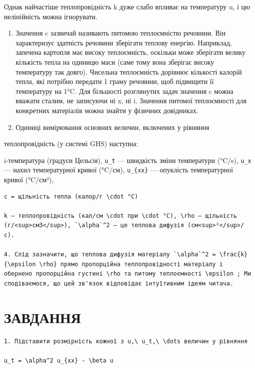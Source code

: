 \documentclass[
  ukrainian,
]{article}
\begin{document}
Однак найчастіше теплопровідність k дуже слабо впливає на температуру u,
і цю нелінійність можна ігнорувати.

\begin{enumerate}
\def\labelenumi{\arabic{enumi}.}
\setcounter{enumi}{1}
\item
  Значення c зазвичай називають питомою теплоємністю речовини. Він
  характеризує здатність речовини зберігати теплову енергію. Наприклад,
  запечена картопля має високу теплоємність, оскільки може зберігати
  велику кількість тепла на одиницю маси (саме тому вона зберігає високу
  температуру так довго). Чисельна теплоємність дорівнює кількості
  калорій тепла, які потрібно передати 1 граму речовини, щоб підвищити
  її температуру на 1°C. Для більшості розглянутих задач значення c
  можна вважати сталим, не записуючи ні x, ні i. Значення питомої
  теплоємності для конкретних матеріалів можна знайти у фізичних
  довідниках.
\item
  Одиниці вимірювання основних величин, включених у рівняння
\end{enumerate}

теплопровідність (у системі GHS) наступна:

i-температура (градуси Цельсія), \texttt{u\_t} --- швидкість зміни
температури (°C/s), \texttt{u\_x} --- нахил температурної кривої
(°C/см), \texttt{u\_\{xx\}} --- опуклість температурної кривої (°C/см²),

\begin{verbatim}
c = щільність тепла (калор/г \cdot °C)

k — теплопровідність (кал/см \cdot при \cdot °C), \rho — щільність (г/<sup>см3</sup>), `\alpha`^2 — це теплова дифузія (см<sup>²</sup>/с).

4. Слід зазначити, що теплова дифузія матеріалу `\alpha`^2 = \frac{k}{\epsilon \rho} прямо пропорційна теплопровідності матеріалу і обернено пропорційна густині \rho та питому теплоємності \epsilon ; Ми сподіваємося, що цей зв'язок відповідає інтуїтивним ідеям читача.
\end{verbatim}

\section{ЗАВДАННЯ}\label{ux437ux430ux432ux434ux430ux43dux43dux44f-2}

\begin{verbatim}
1. Підставити розмірність кожної з u,\ u_t,\ \dots величин у рівняння

u_t = \alpha^2 u_{xx} - \beta u
\end{verbatim}
\end{document}
